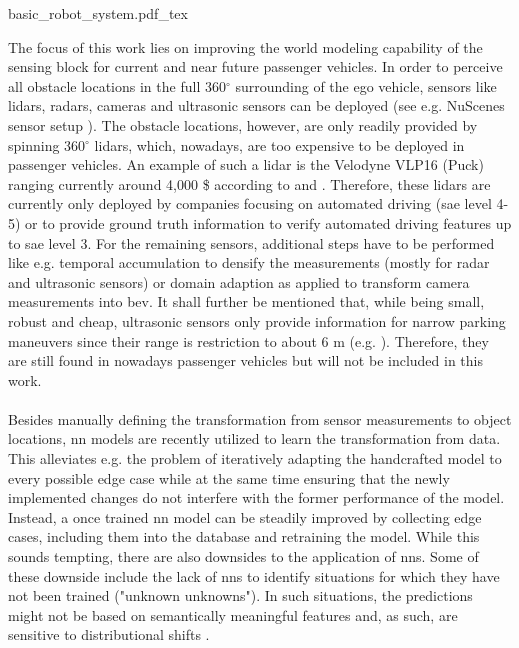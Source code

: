 \begin{center}
	{basic_robot_system.pdf_tex}
\end{center}
The focus of this work lies on improving the world modeling capability of the sensing block for current and near future passenger vehicles. In order to perceive all obstacle locations in the full 360$^{\circ}$ surrounding of the ego vehicle, sensors like lidars, radars, cameras and ultrasonic sensors can be deployed (see e.g. NuScenes sensor setup \cite{caesar2020nuscenes}). The obstacle locations, however, are only readily provided by spinning 360$^{\circ}$ lidars, which, nowadays, are too expensive to be deployed in passenger vehicles. An example of such a lidar is the Velodyne VLP16 (Puck) ranging currently around 4,000 \$ according to \cite{cnet2018} and \cite{velodyne2018}. Therefore, these lidars are currently only deployed by companies focusing on automated driving (\gls{sae} level 4-5) or to provide ground truth information to verify automated driving features up to \gls{sae} level 3. For the remaining sensors, additional steps have to be performed like e.g. temporal accumulation to densify the measurements (mostly for radar and ultrasonic sensors) or domain adaption as applied to transform camera measurements into \gls{bev}. It shall further be mentioned that, while being small, robust and cheap, ultrasonic sensors only provide information for narrow parking maneuvers since their range is restriction to about 6 m (e.g. \cite{boschultrasonic2022}). Therefore, they are still found in nowadays passenger vehicles but will not be included in this work.
\\\\
Besides manually defining the transformation from sensor measurements to object locations, \gls{nn} models are recently utilized to learn the transformation from data. This alleviates e.g. the problem of iteratively adapting the handcrafted model to every possible edge case while at the same time ensuring that the newly implemented changes do not interfere with the former performance of the model. Instead, a once trained \gls{nn} model can be steadily improved by collecting edge cases, including them into the database and retraining the model. While this sounds tempting, there are also downsides to the application of \gls{nn}s. Some of these downside include the lack of \gls{nn}s to identify situations for which they have not been trained ("unknown unknowns"). In such situations, the predictions might not be based on semantically meaningful features and, as such, are sensitive to distributional shifts \cite{safetyfirst2019}.
